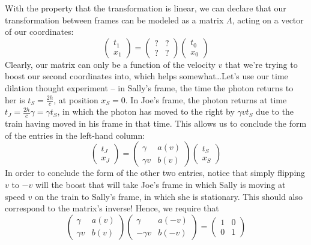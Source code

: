 With the property that the transformation is linear, we can declare that our transformation between frames can be modeled as a matrix $\Lambda$, acting on a vector of our coordinates: 
\[
    \begin{pmatrix} 
    t_1 \\ x_1
    \end{pmatrix} = \begin{pmatrix}
    ? & ? \\ ? & ? 
    \end{pmatrix}\begin{pmatrix} 
    t_0 \\ x_0
    \end{pmatrix}
\]  
Clearly, our matrix can only be a function of the velocity $v$ that we're trying to boost our second coordinates into, which helps somewhat\ldots Let's use our time dilation thought experiment --  in Sally's frame, the time the photon returns to her is $t_S = \frac{2h}{c}$, at position $x_S = 0$. In Joe's frame, the photon returns at time $t_J = \frac{2h}{c}\gamma = \gamma t_S$, in which the photon has moved to the right by $\gamma v t_S$ due to the train having moved in his frame in that time. This allows us to conclude the form of the entries in the left-hand column: 
\[
    \begin{pmatrix} 
    t_J \\ x_J
    \end{pmatrix} = \begin{pmatrix}
    \gamma & a(v) \\ \gamma v & b(v) 
    \end{pmatrix}\begin{pmatrix} 
    t_S \\ x_S
    \end{pmatrix}
\]  
In order to conclude the form of the other two entries, notice that simply flipping $v$ to $-v$ will the boost that will take Joe's frame in which Sally is moving at speed $v$ on the train to Sally's frame, in which she is stationary. This should also correspond to the matrix's inverse! Hence, we require that 
\[
\begin{pmatrix}
    \gamma & a(v) \\ \gamma v & b(v) 
    \end{pmatrix}\begin{pmatrix}
    \gamma & a(-v) \\ -\gamma v & b(-v) 
    \end{pmatrix} = \begin{pmatrix}
    1 & 0 \\ 0 & 1 
    \end{pmatrix}
\]
